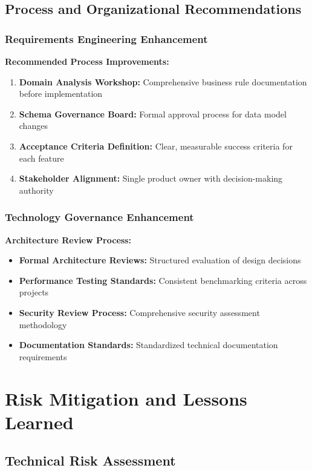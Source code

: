 \subsection{Process and Organizational Recommendations}

\subsubsection{Requirements Engineering Enhancement}

\textbf{Recommended Process Improvements:}
\begin{enumerate}
    \item \textbf{Domain Analysis Workshop:} Comprehensive business rule documentation before implementation
    \item \textbf{Schema Governance Board:} Formal approval process for data model changes
    \item \textbf{Acceptance Criteria Definition:} Clear, measurable success criteria for each feature
    \item \textbf{Stakeholder Alignment:} Single product owner with decision-making authority
\end{enumerate}

\subsubsection{Technology Governance Enhancement}

\textbf{Architecture Review Process:}
\begin{itemize}
    \item \textbf{Formal Architecture Reviews:} Structured evaluation of design decisions
    \item \textbf{Performance Testing Standards:} Consistent benchmarking criteria across projects
    \item \textbf{Security Review Process:} Comprehensive security assessment methodology
    \item \textbf{Documentation Standards:} Standardized technical documentation requirements
\end{itemize}

\section{Risk Mitigation and Lessons Learned}

\subsection{Technical Risk Assessment}

